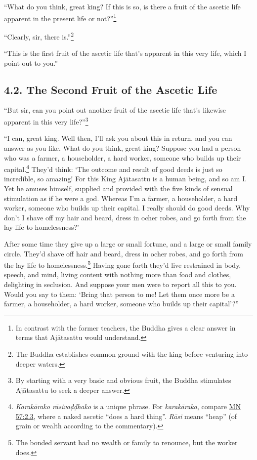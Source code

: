 \documentclass[12pt,openany]{book}%
\begin{document}
“What do you think, great king? If this is so, is there a fruit of the ascetic life apparent in the present life or not?”\footnote{In contrast with the former teachers, the Buddha gives a clear answer in terms that \textsanskrit{Ajātasattu} would understand. } 

“Clearly, sir, there is.”\footnote{The Buddha establishes common ground with the king before venturing into deeper waters. } 

“This is the first fruit of the ascetic life that’s apparent in this very life, which I point out to you.” 

\subsection*{4.2. The Second Fruit of the Ascetic Life }

“But sir, can you point out another fruit of the ascetic life that’s likewise apparent in this very life?”\footnote{By starting with a very basic and obvious fruit, the Buddha stimulates \textsanskrit{Ajātasattu} to seek a deeper answer. } 

“I can, great king. Well then, I’ll ask you about this in return, and you can answer as you like. What do you think, great king? Suppose you had a person who was a farmer, a householder, a hard worker, someone who builds up their capital.\footnote{\textit{\textsanskrit{Karakārako} \textsanskrit{rāsivaḍḍhako}} is a unique phrase. For \textit{\textsanskrit{karakāraka}}, compare \href{https://suttacentral.net/mn57/en/sujato\#2.3}{MN 57:2.3}, where a naked ascetic “does a hard thing”. \textit{\textsanskrit{Rāsi}} means “heap” (of grain or wealth according to the commentary). } They’d think: ‘The outcome and result of good deeds is just so incredible, so amazing! For this King \textsanskrit{Ajātasattu} is a human being, and so am I. Yet he amuses himself, supplied and provided with the five kinds of sensual stimulation as if he were a god. Whereas I’m a farmer, a householder, a hard worker, someone who builds up their capital. I really should do good deeds. Why don’t I shave off my hair and beard, dress in ocher robes, and go forth from the lay life to homelessness?’ 

After some time they give up a large or small fortune, and a large or small family circle. They’d shave off hair and beard, dress in ocher robes, and go forth from the lay life to homelessness.\footnote{The bonded servant had no wealth or family to renounce, but the worker does. } Having gone forth they’d live restrained in body, speech, and mind, living content with nothing more than food and clothes, delighting in seclusion. And suppose your men were to report all this to you. Would you say to them: ‘Bring that person to me! Let them once more be a farmer, a householder, a hard worker, someone who builds up their capital’?” 
\end{document}
